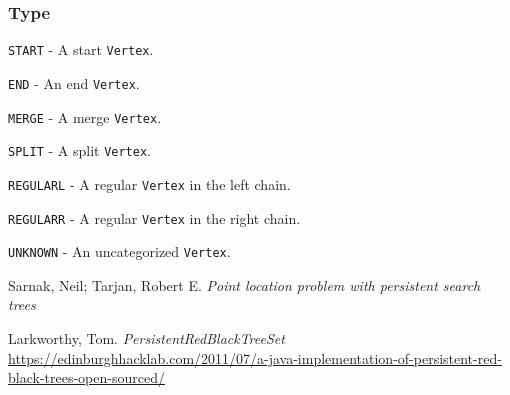 \documentclass[11pt]{article}
\begin{document}
\subsubsection{Type}
\label{sec:verttype}

\texttt{START} - A start \texttt{Vertex}.

\texttt{END} - An end \texttt{Vertex}.

\texttt{MERGE} - A merge \texttt{Vertex}.

\texttt{SPLIT} - A split \texttt{Vertex}.

\texttt{REGULARL} - A regular \texttt{Vertex} in the left chain.

\texttt{REGULARR} - A regular \texttt{Vertex} in the right chain.

\texttt{UNKNOWN} - An uncategorized \texttt{Vertex}.

\begin{thebibliography}{9}
	Sarnak, Neil; Tarjan, Robert E.
	\textit{Point location problem with persistent search trees}
	
	Larkworthy, Tom.
	\textit{PersistentRedBlackTreeSet}
	\url{https://edinburghhacklab.com/2011/07/a-java-implementation-of-persistent-red-black-trees-open-sourced/}
\end{thebibliography}
\end{document}
